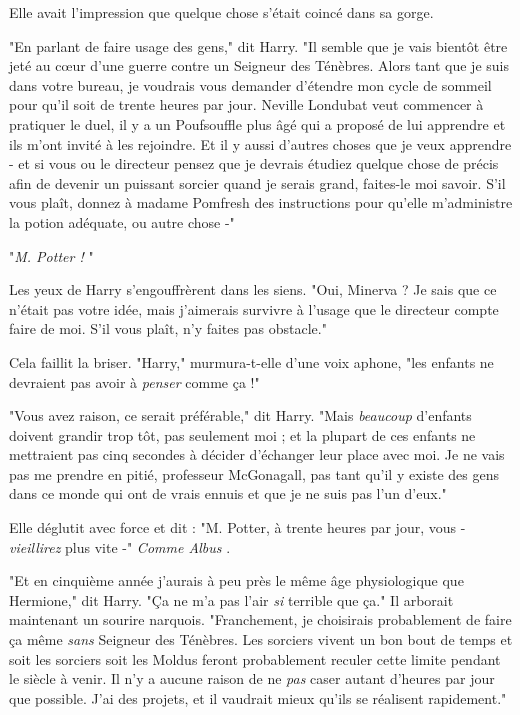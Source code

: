Elle avait l'impression que quelque chose s'était coincé dans sa gorge.

"En parlant de faire usage des gens," dit Harry. "Il semble que je vais bientôt être jeté au cœur d'une guerre contre un Seigneur des Ténèbres. Alors tant que je suis dans votre bureau, je voudrais vous demander d'étendre mon cycle de sommeil pour qu'il soit de trente heures par jour. Neville Londubat veut commencer à pratiquer le duel, il y a un Poufsouffle plus âgé qui a proposé de lui apprendre et ils m'ont invité à les rejoindre. Et il y aussi d'autres choses que je veux apprendre - et si vous ou le directeur pensez que je devrais étudiez quelque chose de précis afin de devenir un puissant sorcier quand je serais grand, faites-le moi savoir. S'il vous plaît, donnez à madame Pomfresh des instructions pour qu'elle m'administre la potion adéquate, ou autre chose -"

"\emph{M. Potter !} "

Les yeux de Harry s'engouffrèrent dans les siens. "Oui, Minerva ? Je sais que ce n'était pas votre idée, mais j'aimerais survivre à l'usage que le directeur compte faire de moi. S'il vous plaît, n'y faites pas obstacle."

Cela faillit la briser. "Harry," murmura-t-elle d'une voix aphone, "les enfants ne devraient pas avoir à \emph{penser}  comme ça !"

"Vous avez raison, ce serait préférable," dit Harry. "Mais \emph{beaucoup}  d'enfants doivent grandir trop tôt, pas seulement moi ; et la plupart de ces enfants ne mettraient pas cinq secondes à décider d'échanger leur place avec moi. Je ne vais pas me prendre en pitié, professeur McGonagall, pas tant qu'il y existe des gens dans ce monde qui ont de vrais ennuis et que je ne suis pas l'un d'eux."

Elle déglutit avec force et dit : "M. Potter, à trente heures par jour, vous - \emph{vieillirez}  plus vite -" \emph{Comme Albus} .

"Et en cinquième année j'aurais à peu près le même âge physiologique que Hermione," dit Harry. "Ça ne m'a pas l'air \emph{si}  terrible que ça." Il arborait maintenant un sourire narquois. "Franchement, je choisirais probablement de faire ça même \emph{sans}  Seigneur des Ténèbres. Les sorciers vivent un bon bout de temps et soit les sorciers soit les Moldus feront probablement reculer cette limite pendant le siècle à venir. Il n'y a aucune raison de ne \emph{pas}  caser autant d'heures par jour que possible. J'ai des projets, et il vaudrait mieux qu'ils se réalisent rapidement."

